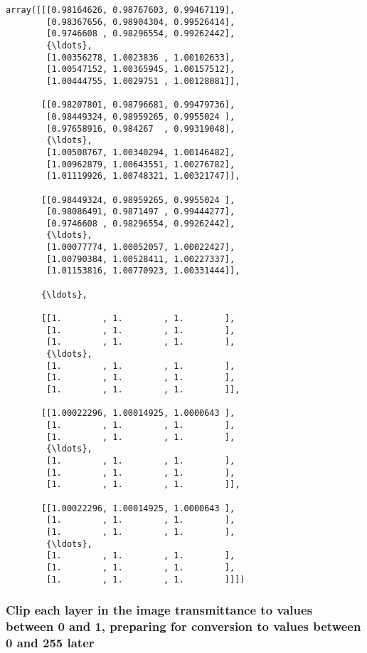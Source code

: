\documentclass[11pt]{article}
\makeatletter
\newcommand{\boxspacing}{\kern\kvtcb@left@rule\kern\kvtcb@boxsep}
\newcommand{\prompt}[4]{
        {\ttfamily\llap{{\color{#2}[#3]:\hspace{3pt}#4}}\vspace{-\baselineskip}}
    }
\makeatother
\begin{document}
            \begin{tcolorbox}[breakable, size=fbox, boxrule=.5pt, pad at break*=1mm, opacityfill=0]
\prompt{Out}{outcolor}{233}{\boxspacing}
\begin{Verbatim}[commandchars=\\\{\}]
array([[[0.98164626, 0.98767603, 0.99467119],
        [0.98367656, 0.98904304, 0.99526414],
        [0.9746608 , 0.98296554, 0.99262442],
        {\ldots},
        [1.00356278, 1.0023836 , 1.00102633],
        [1.00547152, 1.00365945, 1.00157512],
        [1.00444755, 1.0029751 , 1.00128081]],

       [[0.98207801, 0.98796681, 0.99479736],
        [0.98449324, 0.98959265, 0.9955024 ],
        [0.97658916, 0.984267  , 0.99319048],
        {\ldots},
        [1.00508767, 1.00340294, 1.00146482],
        [1.00962879, 1.00643551, 1.00276782],
        [1.01119926, 1.00748321, 1.00321747]],

       [[0.98449324, 0.98959265, 0.9955024 ],
        [0.98086491, 0.9871497 , 0.99444277],
        [0.9746608 , 0.98296554, 0.99262442],
        {\ldots},
        [1.00077774, 1.00052057, 1.00022427],
        [1.00790384, 1.00528411, 1.00227337],
        [1.01153816, 1.00770923, 1.00331444]],

       {\ldots},

       [[1.        , 1.        , 1.        ],
        [1.        , 1.        , 1.        ],
        [1.        , 1.        , 1.        ],
        {\ldots},
        [1.        , 1.        , 1.        ],
        [1.        , 1.        , 1.        ],
        [1.        , 1.        , 1.        ]],

       [[1.00022296, 1.00014925, 1.0000643 ],
        [1.        , 1.        , 1.        ],
        [1.        , 1.        , 1.        ],
        {\ldots},
        [1.        , 1.        , 1.        ],
        [1.        , 1.        , 1.        ],
        [1.        , 1.        , 1.        ]],

       [[1.00022296, 1.00014925, 1.0000643 ],
        [1.        , 1.        , 1.        ],
        [1.        , 1.        , 1.        ],
        {\ldots},
        [1.        , 1.        , 1.        ],
        [1.        , 1.        , 1.        ],
        [1.        , 1.        , 1.        ]]])
\end{Verbatim}
\end{tcolorbox}
        
    \hypertarget{clip-each-layer-in-the-image-transmittance-to-values-between-0-and-1-preparing-for-conversion-to-values-between-0-and-255-later}{%
\subsubsection{Clip each layer in the image transmittance to values
between 0 and 1, preparing for conversion to values between 0 and 255
later}\label{clip-each-layer-in-the-image-transmittance-to-values-between-0-and-1-preparing-for-conversion-to-values-between-0-and-255-later}}
\end{document}
